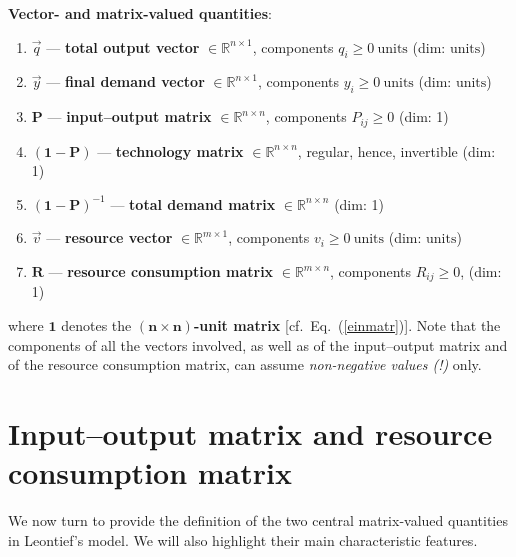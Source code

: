 \medskip
\noindent
{\bf Vector- and matrix-valued quantities}:
%
\begin{enumerate}

\item $\vec{q}$ --- {\bf total output vector}
$\in \mathbb{R}^{n \times 1}$, components $q_{i} \geq 
0~\text{units}$
\hfill (dim: $\text{units}$)

\item $\vec{y}$ --- {\bf final demand vector}
$\in \mathbb{R}^{n \times 1}$, components $y_{i} \geq 
0~\text{units}$
\hfill (dim: $\text{units}$)

\item $\mathbf{P}$ --- {\bf input--output matrix}
$\in \mathbb{R}^{n \times n}$, components $P_{ij} \geq 0$
\hfill (dim: 1)

\item $(\mathbf{1}-\mathbf{P})$ --- {\bf technology matrix}
$\in \mathbb{R}^{n \times n}$, regular, hence, invertible
\hfill (dim: 1)

\item $(\mathbf{1}-\mathbf{P})^{-1}$ --- {\bf total demand matrix}
$\in \mathbb{R}^{n \times n}$
\hfill (dim: 1)

\item $\vec{v}$ --- {\bf resource vector}
$\in \mathbb{R}^{m \times 1}$, components $v_{i} \geq 
0~\text{units}$
\hfill (dim: $\text{units}$)

\item $\mathbf{R}$ --- {\bf resource consumption matrix}
$\in \mathbb{R}^{m \times n}$, components $R_{ij} \geq 0$,
\hfill (dim: 1)

\end{enumerate}
%
where $\mathbf{1}$ denotes the {\bf $\boldsymbol{(n \times 
n)}$-unit matrix} [cf.\ Eq.~(\ref{einmatr})]. Note that the 
components of all the vectors involved, as well as of the 
input--output matrix and of the resource consumption matrix, can 
assume \emph{non-negative values (!)} only.

\section[Input--output matrix and resource consumption matrix]%
{Input--output matrix and resource consumption matrix}
We now turn to provide the definition of the two central matrix-valued quantities in Leontief's model. We will also highlight their main characteristic features.

